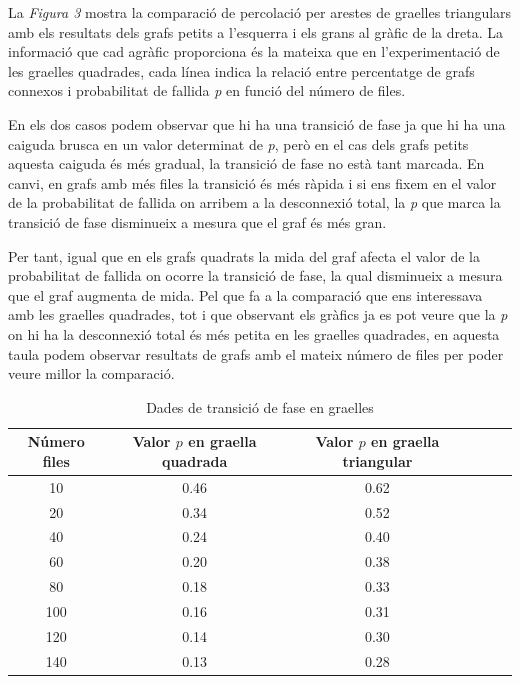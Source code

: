 \documentclass[a4paper]{article}
\begin{document}
	La \textit{Figura 3} mostra la comparació de percolació per arestes de graelles triangulars amb els resultats dels grafs petits a l'esquerra i els grans al gràfic de la dreta. La informació que cad agràfic proporciona és la mateixa que en l'experimentació de les graelles quadrades, cada línea indica la relació entre percentatge de grafs connexos i probabilitat de fallida \textit{p} en funció del número de files.
	
	En els dos casos podem observar que hi ha una transició de fase ja que hi ha una caiguda brusca en un valor determinat de \textit{p}, però en el cas dels grafs petits aquesta caiguda és més gradual, la transició de fase no està tant marcada. En canvi, en grafs amb més files la transició és més ràpida i si ens fixem en el valor de la probabilitat de fallida on arribem a la desconnexió total, la \textit{p} que marca la transició de fase disminueix a mesura que el graf és més gran.
	
	Per tant, igual que en els grafs quadrats la mida del graf afecta el valor de la probabilitat de fallida on ocorre la transició de fase, la qual disminueix a mesura que el graf augmenta de mida. Pel que fa a la comparació que ens interessava amb les graelles quadrades, tot i que observant els gràfics ja es pot veure que la \textit{p} on hi ha la desconnexió total és més petita en les graelles quadrades, en aquesta taula podem observar resultats de grafs amb el mateix número de files per poder veure millor la comparació.
	
	\begin{table}[h]
		\centering
		\begin{tabular}{|c|c|c|c|c|c|}
			\hline
			\rowcolor{gray!30}
			Número files & Valor $p$ en graella quadrada & Valor $p$ en graella triangular \\ \hline
			10 & 0.46 & 0.62 \\ \hline
			20 & 0.34 & 0.52 \\ \hline
			40 & 0.24 & 0.40 \\ \hline
			60 & 0.20 & 0.38 \\ \hline
			80 & 0.18 & 0.33 \\ \hline
			100 & 0.16 & 0.31\\ \hline
			120 & 0.14 & 0.30 \\ \hline
			140 & 0.13 & 0.28 \\ \hline
		\end{tabular}
		\caption{Dades de transició de fase en graelles}
		\label{tab:comparacio_p_square_triangular}
	\end{table}
	
\end{document}
